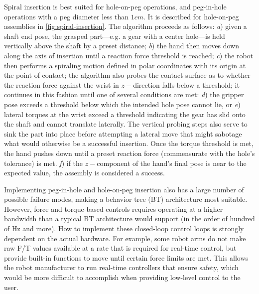 Spiral insertion is best suited for hole-on-peg operations, and peg-in-hole operations with a peg diameter less than $1cm$. It is described for hole-on-peg assemblies in \cref{fig:spiral-insertion}. The algorithm proceeds as follows:
\textsl{a}) given a shaft end pose, the grasped part---e.g. a gear with a center hole---is held vertically above the shaft by a preset distance;
\textsl{b}) the hand then moves down along the axis of insertion until a reaction force threshold is reached;
\textsl{c}) the robot then performs a spiraling motion defined in polar coordinates with its origin at the point of contact; the algorithm also probes the contact surface as to whether the reaction force against the wrist in $z-$direction falls below a threshold; it continues in this fashion until one of several conditions are met:
\textsl{d}) the gripper pose exceeds a threshold below which the intended hole pose cannot lie, or
\textsl{e}) lateral torques at the wrist exceed a threshold indicating the gear has slid onto the shaft and cannot translate laterally.
The vertical probing steps also serve to sink the part into place before attempting a lateral move that might sabotage what would otherwise be a successful insertion. Once the torque threshold is met, the hand pushes down until a preset reaction force (commensurate with the hole's tolerance) is met.
\textsl{f}) if the $z-$component of the hand's final pose is near to the expected value, the assembly is considered a success.

Implementing peg-in-hole and hole-on-peg insertion also has a large number of possible failure modes, making a behavior tree (BT) architecture most suitable.
However, force and torque-based controls requires operating at a higher bandwidth than a typical BT architecture would support (in the order of hundred of Hz and more). How to implement these closed-loop control loops is strongly dependent on the actual hardware.
For example, some robot arms do not make raw F/T values available at a rate that is required for real-time control, but provide built-in functions to move until certain force limits are met. This allows the robot manufacturer to run real-time controllers that ensure safety, which would be more difficult to accomplish when providing low-level control to the user.

